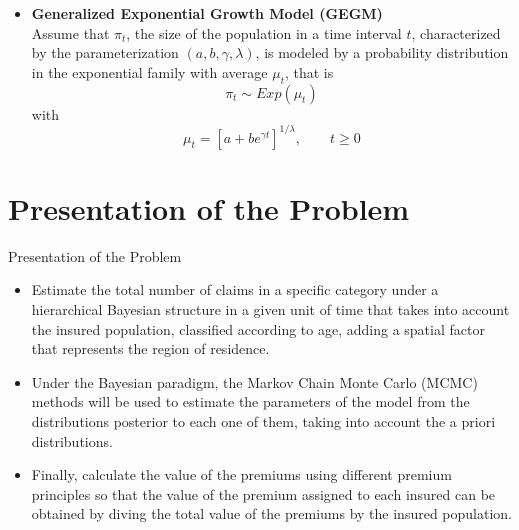 \documentclass[10pt]{beamer} %
\begin{document}
\begin{frame}
\begin{itemize}

    \item \textbf{Generalized Exponential Growth Model
    (GEGM)}\\
    \vspace{0.5cm}
    Assume that $\pi_t$, the size of the population in a time interval $t$, characterized by the parameterization $(a,b,\gamma,\lambda)$, is modeled by a probability distribution in the exponential family with average $\mu_t$, that is $$\pi_t\sim Exp(\mu_t)$$ with $$\mu_t=[a+be^{\gamma t}]^{1/\lambda},\quad\quad t\geq0$$
\end{itemize}
\end{frame}
\section{Presentation of the Problem}
\begin{frame}{Presentation of the Problem}
\begin{itemize}
    \item Estimate the total number of claims in a specific category under a hierarchical Bayesian structure in a given unit of time that takes into account the insured population, classified according to age, adding a spatial factor that represents the region of residence. 
    \item Under the Bayesian paradigm, the Markov Chain Monte Carlo (MCMC) methods will be used to estimate the parameters of the model from the distributions posterior to each one of them, taking into account the a priori distributions.
    \item Finally, calculate the value of the premiums using different premium principles so that the value of the premium assigned to each insured can be obtained by diving the total value of the premiums by the insured population.
\end{itemize}
\end{frame}
\end{document}

